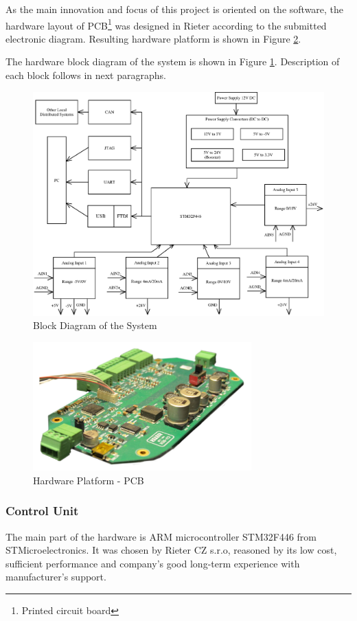 \documentclass[twoside]{ctuthesis}
\theoremstyle{plain}
\theoremstyle{definition}
\theoremstyle{note}
\begin{document}
As the main innovation and focus of this project is oriented on the software, the hardware layout of PCB\footnote{Printed circuit board} was designed in Rieter according to the submitted electronic diagram. Resulting hardware platform is shown in Figure \ref{fig:cvBox_dps}.

The hardware block diagram of the system is shown in Figure \ref{fig:blockDiagram_HW}. Description of each block follows in next paragraphs.
\begin{figure}[h]
	\centering
	\includegraphics[width=1.0\textwidth]{blockSchematic5.eps}
	\caption{Block Diagram of the System}
	\label{fig:blockDiagram_HW}
\end{figure}

\begin{figure}[h]
	\centering
	\includegraphics[width=0.75\textwidth]{cvBox.jpg}
	\caption{Hardware Platform - PCB}
	\label{fig:cvBox_dps}
\end{figure}

\subsubsection{Control Unit}
\label{sec:microController}
The main part of the hardware is ARM microcontroller STM32F446 from STMicroelectronics. It was chosen by Rieter CZ s.r.o, reasoned by its low cost, sufficient performance and company's good long-term experience with manufacturer's support. 
\end{document}

